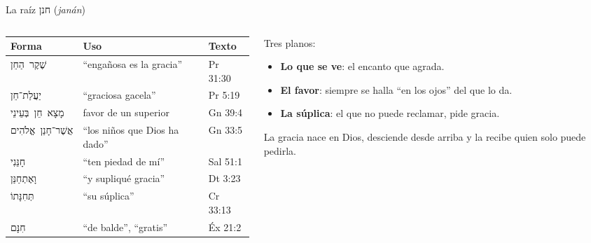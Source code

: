 \documentclass[hyperref={bookmarks=false},aspectratio=169]{beamer}
\newcommand{\heb}[1]{\mbox{\foreignlanguage{hebrew}{#1}}}
\newcommand{\destacar}[1]{\textbf{\textcolor{azul}{#1}}}
\begin{document}
\begin{frame}{La raíz \heb{חנן} (\emph{janán})}
\begin{columns}[t,onlytextwidth]
\begin{column}{0.58\textwidth}
\scriptsize\renewcommand{\arraystretch}{1.1}
\begin{tabular}{@{}>{\RaggedRight\arraybackslash}p{2.3cm}>{\RaggedRight\arraybackslash}p{2.9cm}>{\RaggedRight\arraybackslash}p{1.5cm}@{}}
\toprule
\textbf{Forma} & \textbf{Uso} & \textbf{Texto} \\ \midrule
\heb{שֶׁקֶר הַחֵן} & ``engañosa es la gracia'' & Pr 31:30 \\
\heb{יַעֲלַת־חֵן} & ``graciosa gacela'' & Pr 5:19 \\
\heb{מָצָא חֵן בְּעֵינֵי} & favor de un superior & Gn 39:4 \\
\heb{אֲשֶׁר־חָנַן אֱלֹהִים} & ``los niños que Dios ha dado'' & Gn 33:5 \\
\heb{חָנֵּנִי} & ``ten piedad de mí'' & Sal 51:1 \\
\heb{וָאֶתְחַנַּן} & ``y supliqué gracia'' & Dt 3:23 \\
\heb{תְּחִנָּתוֹ} & ``su súplica'' & 2 Cr 33:13 \\
\heb{חִנָּם} & ``de balde'', ``gratis'' & Éx 21:2 \\
\bottomrule
\end{tabular}
\end{column}
\begin{column}{0.40\textwidth}\small\RaggedRight
Tres planos:
\begin{itemize}
\item \destacar{Lo que se ve}: el encanto que agrada.
\item \destacar{El favor}: siempre se halla ``en los ojos'' del que lo da.
\item \destacar{La súplica}: el que no puede reclamar, pide gracia.
\end{itemize}
La gracia nace en Dios, desciende desde arriba y la recibe quien solo puede pedirla.
\end{column}
\end{columns}
\end{frame}
\end{document}

